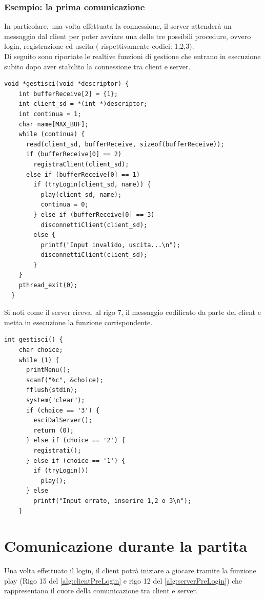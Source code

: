 \documentclass[a4paper]{article}
\begin{document}
 \subsubsection{Esempio: la prima comunicazione}
 In particolare, una volta effettuata la connessione,
il server attenderà un messaggio dal client per poter avviare una delle tre possibili procedure, ovvero login, registrazione ed uscita ( rispettivamente codici: 1,2,3).\\
Di seguito sono riportate le realtive funzioni di gestione che entrano in esecuzione subito dopo aver stabilito la connessione
tra client e server.
\begin{lstlisting}[caption=Prima comunicazione del server, label=alg:serverPreLogin]
  void *gestisci(void *descriptor) {
    int bufferReceive[2] = {1};
    int client_sd = *(int *)descriptor;
    int continua = 1;
    char name[MAX_BUF];
    while (continua) {
      read(client_sd, bufferReceive, sizeof(bufferReceive));
      if (bufferReceive[0] == 2)
        registraClient(client_sd);
      else if (bufferReceive[0] == 1)
        if (tryLogin(client_sd, name)) {
          play(client_sd, name);
          continua = 0;
        } else if (bufferReceive[0] == 3)
          disconnettiClient(client_sd);
        else {
          printf("Input invalido, uscita...\n");
          disconnettiClient(client_sd);
        }
    }
    pthread_exit(0);
  }
\end{lstlisting}
Si noti come il server riceva, al rigo 7, il messaggio codificato da parte del client e metta in esecuzione la funzione corrispondente.
\begin{lstlisting}[caption=Prima comunicazione del client, label=alg:clientPreLogin]
  int gestisci() {
    char choice;
    while (1) {
      printMenu();
      scanf("%c", &choice);
      fflush(stdin);
      system("clear");
      if (choice == '3') {
        esciDalServer();
        return (0);
      } else if (choice == '2') {
        registrati();
      } else if (choice == '1') {
        if (tryLogin())
          play();
      } else
        printf("Input errato, inserire 1,2 o 3\n");
    }
  \end{lstlisting}
\section{Comunicazione durante la partita}
Una volta effettuato il login, il client potrà iniziare a giocare tramite la funzione play 
(Rigo 15 del \autoref{alg:clientPreLogin}  e rigo 12 del \autoref{alg:serverPreLogin}) che rappresentano il cuore della comunicazione tra client e server.\\

\lstlistoflistings
\end{document}
